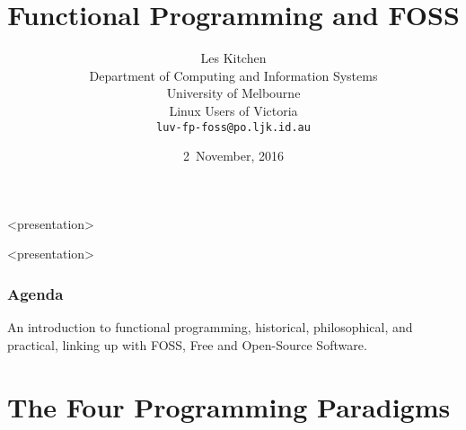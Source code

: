 
{
}

\usepackage{graphicx}
\usepackage[english]{babel}
\usepackage{listings}




\title[FP\&FOSS]
{Functional Programming and FOSS}


\author{Les Kitchen \\
  {\small Department of Computing and Information Systems} \\
  University of Melbourne \\
  Linux Users of Victoria \\
  \texttt{luv-fp-foss@po.ljk.id.au}}

\date{2~November, 2016}



\begin{frame}<presentation>
  \titlepage
\end{frame}



\begin{frame}<presentation>
  \frametitle{Agenda}
  \tableofcontents
\end{frame}


\begin{annotation}
  An introduction to functional programming, historical,
  philosophical, and practical, linking up with FOSS, Free and
  Open-Source Software.
\end{annotation}

\section{The Four Programming Paradigms}

